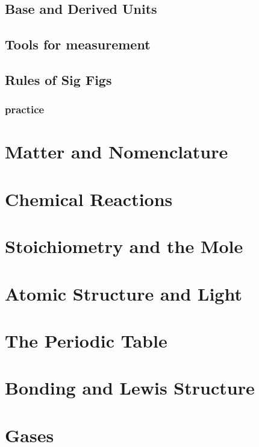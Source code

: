 \documentclass[11pt]{article}
\begin{document}
\subsection{Base and Derived Units}
\label{sec:orge134bc3}

\subsection{Tools for measurement}
\label{sec:org2058678}

\subsection{Rules of Sig Figs}
\label{sec:orgd0ec5c7}

\subsubsection{practice}
\label{sec:org2c781d4}

\newpage



\newpage

\section{Matter and Nomenclature}
\label{sec:orgfd3e257}
\section{Chemical Reactions}
\label{sec:org672a285}
\section{Stoichiometry and the Mole}
\label{sec:orgb1085bf}
\section{Atomic Structure and Light}
\label{sec:orge3319b3}
\section{The Periodic Table}
\label{sec:org2c0e455}
\section{Bonding and Lewis Structure}
\label{sec:org80ecf6c}
\section{Gases}
\label{sec:org44770f1}
\end{document}

